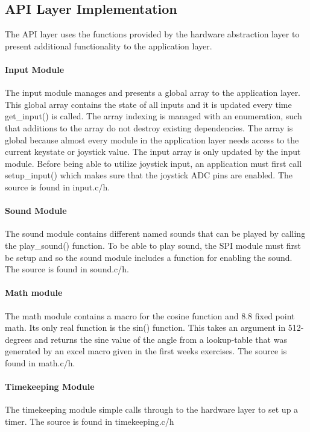 \subsection{API Layer Implementation}
The API layer uses the functions provided by the hardware abstraction layer to present additional functionality to the application
layer.

\paragraph{Input Module}
The input module manages and presents a global array to the application layer. This global array contains the state of all inputs
and it is updated every time get\_input() is called. The array indexing is managed with an enumeration, such that
additions to the array do not destroy existing dependencies. The array is global because almost every module in the
application layer needs access to the current keystate or joystick value. The input array is only updated by the 
input module. Before being able to utilize joystick input, an application must first call setup\_input() which 
makes sure that the joystick ADC pins are enabled. The source is found in input.c/h.

\paragraph{Sound Module}
The sound module contains different named sounds that can be played by calling the play\_sound() function.
To be able to play sound, the SPI module must first be setup and so the sound module includes a
function for enabling the sound. The source is found in sound.c/h.

\paragraph{Math module}
The math module contains a macro for the cosine function and 8.8 fixed point math. Its only real
function is the sin() function. This takes an argument in 512-degrees and returns the
sine value of the angle from a lookup-table that was generated by an excel macro given in
the first weeks exercises. The source is found in math.c/h.

\paragraph{Timekeeping Module}
The timekeeping module simple calls through to the hardware layer to set up a timer. The source is found in
timekeeping.c/h

